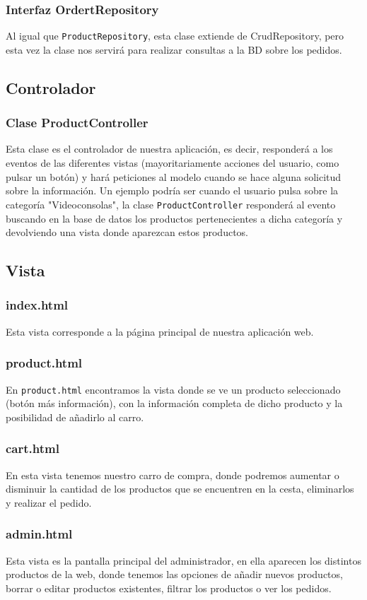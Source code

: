 \documentclass[12pt,a4paper,svgnames]{article}
\begin{document}
\subsubsection{Interfaz OrdertRepository}
Al igual que \texttt{ProductRepository}, esta clase extiende de CrudRepository, pero esta vez la clase nos servirá para realizar consultas a la BD sobre los pedidos.\\
\subsection{Controlador}
\subsubsection{Clase ProductController}
Esta clase es el controlador de nuestra aplicación, es decir, responderá a los eventos de las diferentes vistas (mayoritariamente acciones del usuario, como pulsar un botón) y hará peticiones al modelo cuando se hace alguna solicitud sobre la información.
Un ejemplo podría ser cuando el usuario pulsa sobre la categoría "Videoconsolas", la clase \texttt{ProductController} responderá al evento buscando en la base de datos los productos pertenecientes a dicha categoría y devolviendo una vista donde aparezcan estos productos.\\
\subsection{Vista}
\subsubsection{index.html}
Esta vista corresponde a la página principal de nuestra aplicación web.
\subsubsection{product.html}
En \texttt{product.html} encontramos la vista donde se ve un producto seleccionado (botón más información), con la información completa de dicho producto y la posibilidad de añadirlo al carro.
\subsubsection{cart.html}
En esta vista tenemos nuestro carro de compra, donde podremos aumentar o disminuir la cantidad de los productos que se encuentren en la cesta, eliminarlos y realizar el pedido.
\subsubsection{admin.html}
Esta vista es la pantalla principal del administrador, en ella aparecen los distintos productos de la web, donde tenemos las opciones de añadir nuevos productos, borrar o editar productos existentes, filtrar los productos o ver los pedidos.
\end{document}
